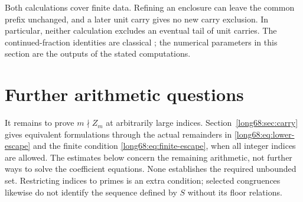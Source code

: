 \documentclass[11pt]{article}
\begin{document}
Both calculations cover finite data. Refining an enclosure can leave the
common prefix unchanged, and a later unit carry gives no new carry
exclusion. In particular, neither calculation excludes an eventual
tail of unit carries. The continued-fraction identities are classical
\cite[\S1.12(ii)]{nist-dlmf}; the numerical parameters in this section
are the outputs of the stated computations.

\section{Further arithmetic questions}\label{long68:sec:open}

It remains to prove $m\nmid Z_m$ at arbitrarily large indices.
Section~\ref{long68:sec:carry} gives equivalent formulations through the
actual remainders in \eqref{long68:eq:lower-escape} and the finite
condition \eqref{long68:eq:finite-escape}, when all integer indices are
allowed. The estimates below concern the remaining arithmetic, not further
ways to solve the coefficient equations. None establishes the required
unbounded set. Restricting indices to primes is an extra condition;
selected congruences likewise do not identify the sequence defined by
$S$ without its floor relations.
\end{document}
